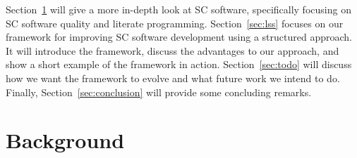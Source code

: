 \documentclass{sig-alternate-05-2015}
\begin{document}
Section~\ref{sec:background} will give a more in-depth look at SC software,
specifically focusing on SC software quality and literate programming. 
Section~\ref{sec:lss} focuses on our framework %
for improving SC software development using a structured approach. It will
introduce the framework, discuss the advantages to our approach, and show
a short example of the framework in action. Section~\ref{sec:todo} will discuss
how we want the framework to evolve and what future work we intend to do.
Finally, Section~\ref{sec:conclusion} will provide some concluding remarks.

%
%
%
%
%
%

\section{Background} \label{sec:background}
\end{document}
